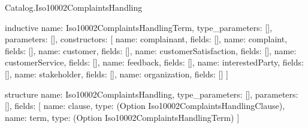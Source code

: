 \begin{lexlean}{Catalog.Iso10002ComplaintsHandling}
\begin{semanticmodule}
inductive{
  name: Iso10002ComplaintsHandlingTerm,
  type_parameters: [],
  parameters: [],
  constructors: [
    {name: complainant, fields: []},
    {name: complaint, fields: []},
    {name: customer, fields: []},
    {name: customerSatisfaction, fields: []},
    {name: customerService, fields: []},
    {name: feedback, fields: []},
    {name: interestedParty, fields: []},
    {name: stakeholder, fields: []},
    {name: organization, fields: []}
  ]
}

structure{
  name: Iso10002ComplaintsHandling,
  type_parameters: [],
  parameters: [],
  fields: [
    {name: clause, type: (Option Iso10002ComplaintsHandlingClause)},
    {name: term, type: (Option Iso10002ComplaintsHandlingTerm)}
  ]
}
\end{semanticmodule}
\end{lexlean}
